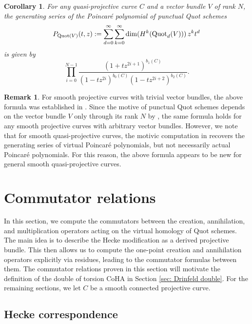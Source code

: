 \documentclass[10pt]{amsart}
\newcommand{\Quot}{\textnormal{Quot}}
\newcommand{\+}{{}^+}
\newtheorem {corollary}[theorem]{Corollary}
\theoremstyle{definition}
\theoremstyle {definition}
\newtheorem{remark}[theorem]{Remark}
\theoremstyle {definition}
\begin{document}
\begin{corollary}\label{cor: Poincare}
For any quasi-projective curve $C$ and a vector bundle $V$ of rank $N$, the generating series of the Poincar\'e polynomial of punctual Quot schemes
\[ P_{\mathrm{Quot}(V)}(t,z) := \sum_{d=0}^{\infty}\sum_{k=0}^{\infty} \dim(H^{k}(\Quot_{d}(V)))\,z^kt^d \] is given by 
\[ \prod_{i=0}^{N-1} \frac{(1+tz^{2i+1})^{b_1(C)}}{(1-tz^{2i})^{b_0(C)}(1-tz^{2i+2})^{b_2(C)}}. \] 
\end{corollary}

\begin{remark}\label{rem: Poincare}
For smooth projective curves with trivial vector bundles, the above formula was established in \cite{Bifet}. Since the motive of punctual Quot schemes depends on the vector bundle $V$ only through its rank $N$ by \cite{BFP}, the same formula holds for any smooth projective curves with arbitrary vector bundles. However, we note that for smooth quasi-projective curves, the motivic computation in \cite{BFP} recovers the generating series of virtual Poincar\'e polynomials, but not necessarily actual Poincar\'e polynomials. For this reason, the above formula appears to be new for general smooth quasi-projective curves. 

\end{remark}







\section{Commutator relations} \label{sec: Commutator relations}

In this section, we compute the commutators between the creation, annihilation, and multiplication operators acting on the virtual homology of Quot schemes. The main idea is to describe the Hecke modification as a derived projective bundle. This then allows us to compute the one-point creation and annihilation operators explicitly via residues, leading to the commutator formulas between them. The commutator relations proven in this section will motivate the definition of the double of torsion CoHA in Section \ref{sec: Drinfeld double}. For the remaining sections, we let $C$ be a smooth connected projective curve.  


\subsection{Hecke correspondence}
\end{document}
